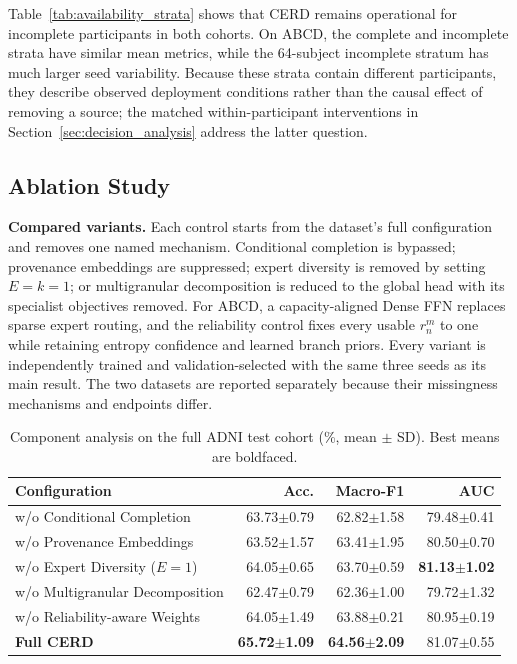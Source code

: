 \documentclass[a4paper,fleqn]{cas-dc}
\begin{document}
Table~\ref{tab:availability_strata} shows that CERD remains operational for incomplete participants in both cohorts. On ABCD, the complete and incomplete strata have similar mean metrics, while the 64-subject incomplete stratum has much larger seed variability. Because these strata contain different participants, they describe observed deployment conditions rather than the causal effect of removing a source; the matched within-participant interventions in Section~\ref{sec:decision_analysis} address the latter question.

\subsection{Ablation Study}
\label{sec:ablation_results}

\noindent\textbf{Compared variants.}
Each control starts from the dataset's full configuration and removes one named mechanism. Conditional completion is bypassed; provenance embeddings are suppressed; expert diversity is removed by setting \(E=k=1\); or multigranular decomposition is reduced to the global head with its specialist objectives removed. For ABCD, a capacity-aligned Dense FFN replaces sparse expert routing, and the reliability control fixes every usable \(r_n^m\) to one while retaining entropy confidence and learned branch priors. Every variant is independently trained and validation-selected with the same three seeds as its main result. The two datasets are reported separately because their missingness mechanisms and endpoints differ.

\begin{table}[t]
\centering
\caption{Component analysis on the full ADNI test cohort (\%, mean $\pm$ SD). Best means are boldfaced.}
\label{tab:adni_ablation}
\setlength{\tabcolsep}{2.5pt}
\renewcommand{\arraystretch}{1.06}
\scriptsize
\begin{tabular*}{\columnwidth}{@{\extracolsep{\fill}}lrrr@{}}
\toprule
\textbf{Configuration} & \textbf{Acc.} & \textbf{Macro-F1} & \textbf{AUC} \\
\midrule
w/o Conditional Completion & 63.73$\pm$0.79 & 62.82$\pm$1.58 & 79.48$\pm$0.41 \\
w/o Provenance Embeddings & 63.52$\pm$1.57 & 63.41$\pm$1.95 & 80.50$\pm$0.70 \\
w/o Expert Diversity ($E=1$) & 64.05$\pm$0.65 & 63.70$\pm$0.59 & \textbf{81.13$\pm$1.02} \\
w/o Multigranular Decomposition & 62.47$\pm$0.79 & 62.36$\pm$1.00 & 79.72$\pm$1.32 \\
w/o Reliability-aware Weights & 64.05$\pm$1.49 & 63.88$\pm$0.21 & 80.95$\pm$0.19 \\
\textbf{Full CERD} & \textbf{65.72$\pm$1.09} & \textbf{64.56$\pm$2.09} & 81.07$\pm$0.55 \\
\bottomrule
\end{tabular*}
\end{table}
\end{document}
